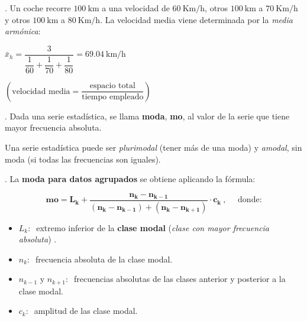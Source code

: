 \vspace{5mm}%
\begin{example}
	. Un coche recorre $100 \ \mathrm{km}$ a una velocidad de $60 \ \mathrm{Km/h}$, otros $100 \ \mathrm{km}$ a 	$70 \ \mathrm{Km/h}$ y otros $100 \ \mathrm{km}$ a $80 \ \mathrm{Km/h}$. La velocidad media viene determinada por la \emph{media armónica}:
	
	\vspace{4mm} $\bar{x}_h=\dfrac{3}{\dfrac 1{60}+\dfrac 1{70} + \dfrac 1{80}}=69.04\ \mathrm{km/h} \quad $
	\begin{tiny}\textcolor{gris}{$\left( \text{velocidad media}=\dfrac{\text{espacio total}}{\text{tiempo empleado}} \right)$}\end{tiny}
\end{example}

\vspace{5mm}%
\begin{definition}
	. Dada una serie estadística, se llama \textbf{moda}, \textbf{mo}, al valor de la serie que tiene mayor frecuencia absoluta.
	
	\vspace{2mm} Una serie estadística puede ser \emph{plurimodal} (tener más de una moda) y \emph{amodal}, sin moda (si todas las frecuencias son iguales).
\end{definition}

\vspace{5mm}%
\begin{theorem}
	. La \textbf{moda para datos agrupados} se obtiene aplicando la fórmula:
	
	$$\boldsymbol{ mo=L_k+\dfrac{n_k-n_{k-1}}{(n_k-n_{k-1})+(n_k-n_{k+1})}\cdot c_k }\ ,\quad \text{ donde:}	$$
	
	\vspace{2mm} \begin{itemize}
	\vspace{-2mm} \item $L_k:\ $ extremo inferior de la \textbf{clase modal} (\emph{clase con mayor frecuencia absoluta})	.
	\vspace{-2mm} \item $n_k:\ $ frecuencia absoluta de la clase modal.
	\vspace{-2mm} \item $n_{k-1} \text{ y } n_{k+1}:\ $ frecuencias absolutas de las clases anterior y posterior a la clase modal.
	\vspace{-2mm} \item $c_k:\ $ amplitud de las clase modal.
	\end{itemize}

\end{theorem}

